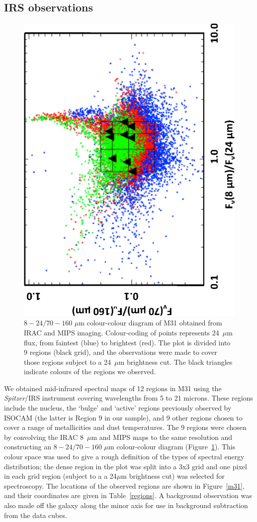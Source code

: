 \subsection{IRS observations}
\label{sect:irs_obs}

\begin{figure}
\centering
\includegraphics[width = 6.5 cm,angle=270]{fig1_redo.eps}
\caption{$8 - 24/70 - 160$ $\mu$m colour-colour diagram of M31 obtained from IRAC and MIPS imaging. Colour-coding of points represents
24~$\mu$m flux, from faintest (blue) to brightest (red). The plot is divided into 9 regions (black grid), and the observations were made to 
cover those regions subject to a 24~$\mu$m brightness cut. The black triangles indicate colours of the regions we observed.}
\label{colourmaps}
\end{figure}

We obtained mid-infrared spectral maps of 12 regions in M31 using the {\em Spitzer}/IRS instrument \citep{IRS2004} covering wavelengths from 5 to 21 microns. 
These regions include the nucleus, the `bulge' and `active' regions previously observed by ISOCAM (the latter is Region 9 in our sample), 
and 9 other regions chosen to cover a range of metallicities and dust temperatures. The 9 regions were chosen by convolving the IRAC 8~$\mu$m \citep{Barmby2006lr}
and MIPS \citep{gordon06a} maps to the same resolution and constructing an $8 - 24/70 - 160$ $\mu$m colour-colour diagram (Figure~\ref{colourmaps}).
This colour space was used to give a rough definition of the types of spectral energy distribution; the 
dense region in the plot was split into a 3x3 grid and one pixel in each grid region (subject to a  a 24$\mu$m brightness cut)
was selected for spectroscopy. The locations of the observed regions are shown in Figure~\ref{m31}, and 
their coordinates are given in Table~\ref{regions}. A background observation was also made off the galaxy 
along the minor axis for use in background subtraction from the data cubes.


